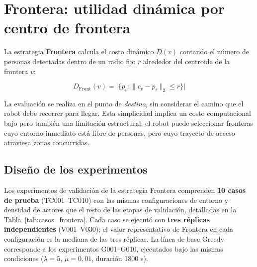 \section{Frontera: utilidad dinámica por centro de frontera}%
\label{sec:exp_e1}

La estrategia \textbf{Frontera} calcula el costo dinámico $D(v)$ contando el número de personas detectadas dentro de un radio fijo $r$ alrededor del centroide de la frontera $v$:

\begin{equation}
    D_{\text{Front}}(v) = \bigl|\{ p_i : \| c_v - p_i \|_2 \leq r \}\bigr|
\end{equation}

\noindent La evaluación se realiza en el punto de \emph{destino}, sin considerar el camino que el robot debe recorrer para llegar. Esta simplicidad implica un costo computacional bajo pero también una limitación estructural: el robot puede seleccionar fronteras cuyo entorno inmediato está libre de personas, pero cuyo trayecto de acceso atraviesa zonas concurridas.

\subsection{Diseño de los experimentos}

Los experimentos de validación de la estrategia Frontera comprenden \textbf{10 casos de prueba} (TC001–TC010) con las mismas configuraciones de entorno y densidad de actores que el resto de las etapas de validación, detalladas en la Tabla~\ref{tab:casos_frontera}. Cada caso se ejecutó con \textbf{tres réplicas independientes} (V001–V030); el valor representativo de Frontera en cada configuración es la mediana de las tres réplicas. La línea de base Greedy corresponde a los experimentos G001–G010, ejecutados bajo las mismas condiciones ($\lambda = 5$, $\mu = 0{,}01$, duración 1800 s).

